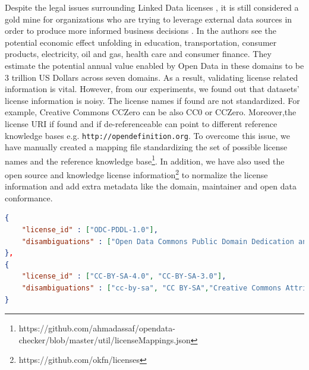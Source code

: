 \documentclass[runningheads,a4paper]{llncs}
\begin{document}
Despite the legal issues surrounding Linked Data licenses \cite{nomoneyLOD}, it is still considered a gold mine for organizations who are trying to leverage external data sources in order to produce more informed business decisions \cite{Boyd2011}. In \cite{mckinseyreport} the authors see the potential economic effect unfolding in education, transportation, consumer products, electricity, oil and gas, health care and consumer finance. They estimate the potential annual value enabled by Open Data in these domains to be 3 trillion US Dollars across seven domains. As a result, validating license related information is vital. However, from our experiments, we found out that datasets' license information is noisy. The license names if found are not standardized. For example, Creative Commons CCZero can be also CC0 or CCZero. Moreover,the license URI if found and if de-referenceable can point to different reference knowledge bases e.g. \texttt{http://opendefinition.org}. To overcome this issue, we have manually created a mapping file standardizing the set of possible license names and the reference knowledge base\footnote{https://github.com/ahmadassaf/opendata-checker/blob/master/util/licenseMappings.json}. In addition, we have also used the open source and knowledge license information\footnote{https://github.com/okfn/licenses} to normalize the license information and add extra metadata like the domain, maintainer and open data conformance.

\begin{lstlisting}[language=json]
{
	"license_id" : ["ODC-PDDL-1.0"],
	"disambiguations" : ["Open Data Commons Public Domain Dedication and License (PDDL)"]
},
{
	"license_id" : ["CC-BY-SA-4.0", "CC-BY-SA-3.0"],
	"disambiguations" : ["cc-by-sa", "CC BY-SA","Creative Commons Attribution Share-Alike"]
}
\end{lstlisting}



\end{document}
